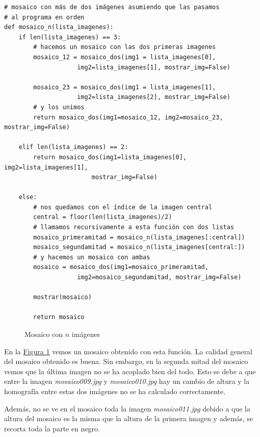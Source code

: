 \documentclass[11pt,a4paper]{article}
\theoremstyle{plain}
\theoremstyle{definition}
\begin{document}
\begin{verbatim}
# mosaico con más de dos imágenes asumiendo que las pasamos 
# al programa en orden
def mosaico_n(lista_imagenes):
    if len(lista_imagenes) == 3:
        # hacemos un mosaico con las dos primeras imagenes
        mosaico_12 = mosaico_dos(img1 = lista_imagenes[0], 
                    img2=lista_imagenes[1], mostrar_img=False)

        mosaico_23 = mosaico_dos(img1 = lista_imagenes[1], 
                    img2=lista_imagenes[2], mostrar_img=False)
        # y los unimos
        return mosaico_dos(img1=mosaico_12, img2=mosaico_23, mostrar_img=False)

    elif len(lista_imagenes) == 2:
        return mosaico_dos(img1=lista_imagenes[0], img2=lista_imagenes[1], 
                        mostrar_img=False)

    else:
        # nos quedamos con el índice de la imagen central
        central = floor(len(lista_imagenes)/2)
        # llamamos recursivamente a esta función con dos listas
        mosaico_primeramitad = mosaico_n(lista_imagenes[:central])
        mosaico_segundamitad = mosaico_n(lista_imagenes[central:])
        # y hacemos un mosaico con ambas
        mosaico = mosaico_dos(img1=mosaico_primeramitad, 
                    img2=mosaico_segundamitad, mostrar_img=False)

        mostrar(mosaico)

        return mosaico
\end{verbatim}

\begin{figure}[!h]
    \centering
    \caption{Mosaico con $n$ imágenes}
    \label{nimagenes}
\end{figure}

En la \hyperref[nimagenes]{Figura \ref*{nimagenes}} vemos un mosaico obtenido con esta función. La calidad general del mosaico obtenido es buena. Sin embargo, en la segunda mitad del mosaico vemos que la última imagen no se ha acoplado bien del todo. Esto se debe a que entre la imagen \textit{mosaico009.jpg} y \textit{mosaico010.jpg} hay un cambio de altura y la homografía entre estas dos imágenes no se ha calculado correctamente.

Además, no se ve en el mosaico toda la imagen \textit{mosaico011.jpg} debido a que la altura del mosaico es la misma que la altura de la primera imagen y además, se recorta toda la parte en negro.
\end{document}
